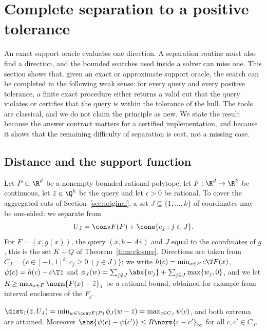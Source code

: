 \section{Complete separation to a positive tolerance}\label{sec:separation}

An exact support oracle evaluates one direction. A separation routine
must also find a direction, and the bounded searches used inside a solver
can miss one. This section shows that, given an exact or approximate
support oracle, the search can be completed in the following weak sense:
for every query and every positive tolerance, a finite exact procedure
either returns a valid cut that the query violates or certifies that the
query is within the tolerance of the hull. The tools are classical, and
we do not claim the principle as new. We state the result because the
answer contract matters for a certified implementation, and because it
shows that the remaining difficulty of separation is cost, not a missing
case.

\subsection{Distance and the support function}

Let $P\subset\R^d$ be a nonempty bounded rational polytope, let
$F:\R^d\to\R^k$ be continuous, let $\bar z\in\Q^k$ be the query and let
$\epsilon>0$ be rational. To cover the aggregated cuts of
Section~\ref{sec:original}, a set $J\subseteq\{1,\dots,k\}$ of coordinates
may be one-sided: we separate from
\[
U_J=\conv F(P)+\cone\{e_j:j\in J\}.
\]
For $F=(x,g(x))$, the query $(\bar x,b-A\bar v)$ and $J$ equal to the
coordinates of $g$, this is the set $K+Q$ of Theorem~\ref{thm:closure}.
Directions are taken from $C_J=\{c\in[-1,1]^k:c_j\ge0\ (j\in J)\}$; we write
$h(c)=\min_{x\in P}c\T F(x)$, $\psi(c)=h(c)-c\T\bar z$ and
$\phi_J(w)=\sum_{j\notin J}\abs{w_j}+\sum_{j\in J}\max\{w_j,0\}$, and we let
$R\ge\max_{x\in P}\norm{F(x)-\bar z}_1$ be a rational bound, obtained for
example from interval enclosures of the $F_j$.

\begin{lemma}\label{lem:distance}
$\dist_1(\bar z,U_J)=\min_{w\in\conv F(P)}\phi_J(w-\bar z)=\max_{c\in C_J}\psi(c)$,
and both extrema are attained. Moreover
$\abs{\psi(c)-\psi(c')}\le R\norm{c-c'}_\infty$ for all $c,c'\in C_J$.
\end{lemma}

